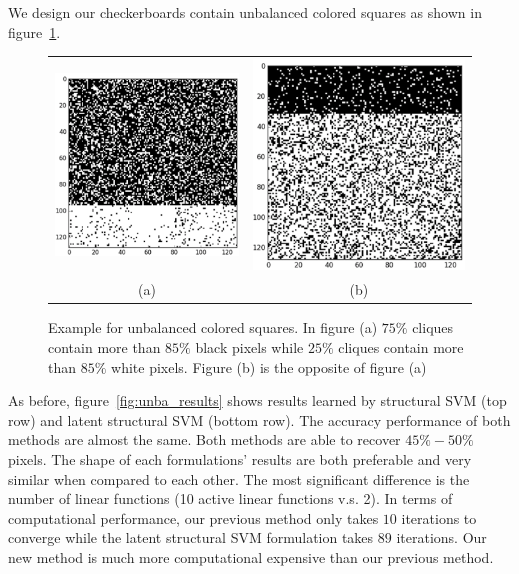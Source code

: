 We design our checkerboards contain unbalanced colored squares as
shown in figure~\ref{fig:unba_checkerboard}.

\begin{figure}[hb]
  \centering
  \setlength{\tabcolsep}{2pt}
  \begin{tabular}{cc}
    \includegraphics[width=0.5\columnwidth]{Part2/figures/unba_black.png}&
                                                                            \includegraphics[width=0.5\columnwidth]{Part2/figures/unba_white.png}\\
    {\small (a)} & {\small (b)} 
  \end{tabular}
  \caption{\label{fig:unba_checkerboard} Example for unbalanced
    colored squares. In figure (a) $75\%$ cliques contain more
    than $85\%$ black pixels while $25\%$ cliques contain more
    than $85\%$ white pixels. Figure (b) is the opposite of
    figure (a)}
\end{figure}

As before, figure~\ref{fig:unba_results} shows results learned by
structural SVM (top row) and latent structural SVM (bottom row).
The accuracy performance of both methods are almost the same.
Both methods are able to recover $45\%-50\%$ pixels. The shape of
each formulations' results are both preferable and very similar
when compared to each other. The most significant difference is
the number of linear functions (10 active linear functions v.s.
2). In terms of computational performance, our previous method
only takes $10$ iterations to converge while the latent
structural SVM formulation takes $89$ iterations. Our new method
is much more computational expensive than our previous method.

